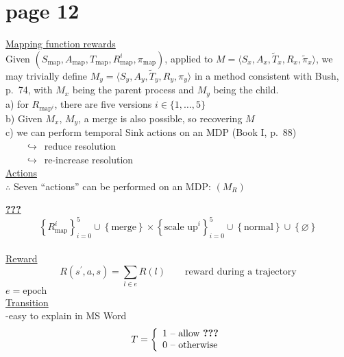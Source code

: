\section*{page 12}

\underline{Mapping function rewards}\\

Given $(S_{\textrm{map}}, A_{\textrm{map}}, T_{\textrm{map}}, R^{i}_{\textrm{map}}, \pi_{\textrm{map}})$, applied to $M=\langle S_x, A_x, \tilde{T}_x, R_x, \tilde{\pi}_x \rangle$, we may trivially define $M_y=\langle S_y, A_y, \tilde{T}_y, R_y, \pi_y \rangle$ in a method consistent with Bush, p.\ 74, with $M_x$ being the parent process and $M_y$ being the child.\\

a) for $R_{\textrm{map}^{i}}$, there are five versions $i\in\{1,\ldots,5\}$\\
b) Given $M_x$, $M_y$, a merge is also possible, so recovering $M$\\
c) we can perform temporal Sink actions on an MDP (Book I, p.\ 88)\\
${}\qquad\hookrightarrow$\ reduce resolution\\
${}\qquad\hookrightarrow$\ re-increase resolution\\

\underline{Actions}\\

$\therefore$ Seven ``actions'' can be performed on an MDP: $(M_R)$\\

$\qquad$\begin{minipage}[t]{0.9\textwidth}
\underline{\textbf{???}}\\

\begin{equation*}
\left\{R^i_{\textrm{map}}\right\}_{i=0}^{5}\cup \left\{\text{merge}\right\}\times\left\{\text{scale\ up}^{i}\right\}_{i=0}^{5}\cup\left\{\text{normal}\right\}\cup\left\{\varnothing\right\}
\end{equation*}\\

\underline{Reward}\\

\begin{equation*}
R(s^\prime,a,s)=\sum_{l\in e}R(l)\qquad\text{reward during a trajectory}
\end{equation*}
$e=\text{epoch}$\\

\underline{Transition}\\

-easy to explain in MS Word
\begin{equation*}
T=\left\{
\begin{array}{l}
1\ \text{-- allow \textbf{???}}\\
0\ \text{-- otherwise}
\end{array}
\right.
\end{equation*}
\end{minipage}

